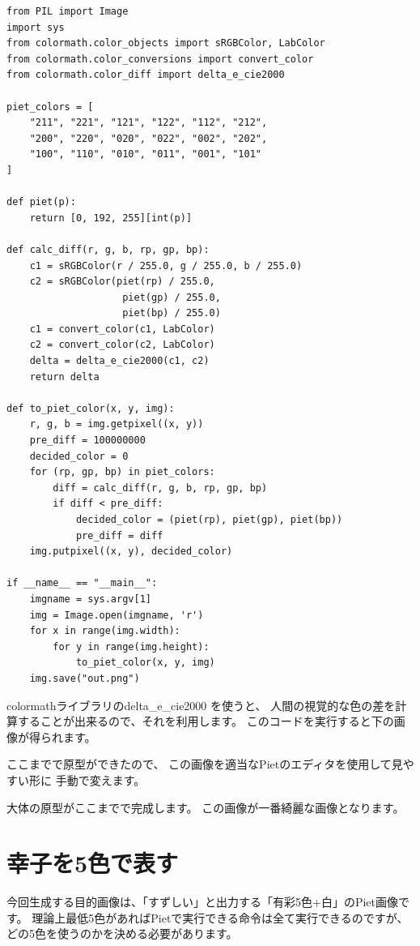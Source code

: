 \begin{lstlisting}
from PIL import Image
import sys
from colormath.color_objects import sRGBColor, LabColor
from colormath.color_conversions import convert_color
from colormath.color_diff import delta_e_cie2000

piet_colors = [
    "211", "221", "121", "122", "112", "212",
    "200", "220", "020", "022", "002", "202",
    "100", "110", "010", "011", "001", "101"
]

def piet(p):
    return [0, 192, 255][int(p)]

def calc_diff(r, g, b, rp, gp, bp):
    c1 = sRGBColor(r / 255.0, g / 255.0, b / 255.0)
    c2 = sRGBColor(piet(rp) / 255.0,
                    piet(gp) / 255.0,
                    piet(bp) / 255.0)
    c1 = convert_color(c1, LabColor)
    c2 = convert_color(c2, LabColor)
    delta = delta_e_cie2000(c1, c2)
    return delta

def to_piet_color(x, y, img):
    r, g, b = img.getpixel((x, y))
    pre_diff = 100000000
    decided_color = 0
    for (rp, gp, bp) in piet_colors:
        diff = calc_diff(r, g, b, rp, gp, bp)
        if diff < pre_diff:
            decided_color = (piet(rp), piet(gp), piet(bp))
            pre_diff = diff
    img.putpixel((x, y), decided_color)

if __name__ == "__main__":
    imgname = sys.argv[1]
    img = Image.open(imgname, 'r')
    for x in range(img.width):
        for y in range(img.height):
            to_piet_color(x, y, img)
    img.save("out.png")
\end{lstlisting}

colormathライブラリのdelta\_e\_cie2000 を使うと、
人間の視覚的な色の差を計算することが出来るので、それを利用します。
このコードを実行すると下の画像が得られます。


ここまでで原型ができたので、
この画像を適当なPietのエディタを使用して見やすい形に
手動で変えます。


大体の原型がここまでで完成します。
この画像が一番綺麗な画像となります。

\section{幸子を5色で表す}

今回生成する目的画像は、「すずしい」と出力する「有彩5色+白」のPiet画像です。
理論上最低5色があればPietで実行できる命令は全て実行できるのですが、
どの5色を使うのかを決める必要があります。

